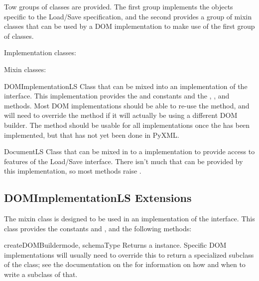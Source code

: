 \documentclass{howto}
\begin{document}
Tow groups of classes are provided.  The first group implements the
objects specific to the Load/Save specification, and the second
provides a group of mixin classes that can be used by a DOM
implementation to make use of the first group of classes.

Implementation classes:


Mixin classes:

\begin{classdesc*}{DOMImplementationLS}
  Class that can be mixed into an implementation of the
   interface.  This implementation provides
  the  and 
  constants and the ,
  , and 
  methods.  Most DOM implementations should be able to re-use the
   method, and will need to override
  the  method if it will actually be using
  a different DOM builder.  The  method
  should be usable for all implementations once the 
  has been implemented, but that has not yet been done in PyXML.
\end{classdesc*}

\begin{classdesc*}{DocumentLS}
  Class that can be mixed in to a  implementation to
  provide access to features of the Load/Save interface.  There isn't
  much that can be provided by this implementation, so most methods
  raise .
\end{classdesc*}


\subsection{DOMImplementationLS Extensions}

The  mixin class is designed to be used in
an implementation of the  interface.  This
class provides the constants  and
, and the following methods:

\begin{methoddesc}[DOMImplementationLS]{createDOMBuilder}{mode, schemaType}
  Returns a  instance.  Specific DOM implementations
  will usually need to override this to return a specialized subclass
  of the  class; see the documentation on the
   for information on how and when to write a
  subclass of that.
\end{methoddesc}
\end{document}
